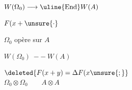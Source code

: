 $W(\Omega_0)\longrightarrow\uline{\operatorname{End}}W(A)$

$F(x+\unsure{\cdot}$

$\Omega_0$ opère sur $A$

$W(\Omega_0)\ --\ W(A)$

$\deleted{F(x+y)=\Delta F(x\unsure{;}}$\\
$\Omega_0\otimes\Omega_0\qquad A\otimes A$


